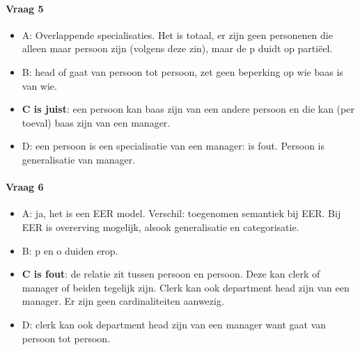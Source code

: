 \documentclass[10pt,a4paper]{report}
\begin{document}
\paragraph{Vraag 5}
\begin{itemize}
\item A: Overlappende specialisaties. Het is totaal, er zijn geen personenen die alleen maar persoon zijn (volgens deze zin), maar de p duidt op partiëel.
\item B: head of gaat van persoon tot persoon, zet geen beperking op wie baas is van wie.
\item \textbf{C is juist}: een persoon kan baas zijn van een andere persoon en die kan (per toeval) baas zijn van een manager.
\item D: een persoon is een specialisatie van een manager: is fout. Persoon is generalisatie van manager.
\end{itemize}

\paragraph{Vraag 6}
\begin{itemize}
\item A: ja, het is een EER model. Verschil: toegenomen semantiek bij EER. Bij EER is overerving mogelijk, alsook generalisatie en categorisatie.
\item B: p en o duiden erop.
\item \textbf{C is fout}: de relatie zit tussen persoon en persoon. Deze kan clerk of manager of beiden tegelijk zijn. Clerk kan ook department head zijn van een manager. Er zijn geen cardinaliteiten aanwezig.
\item D: clerk kan ook department head zijn van een manager want gaat van persoon tot persoon.
\end{itemize}
\end{document}
